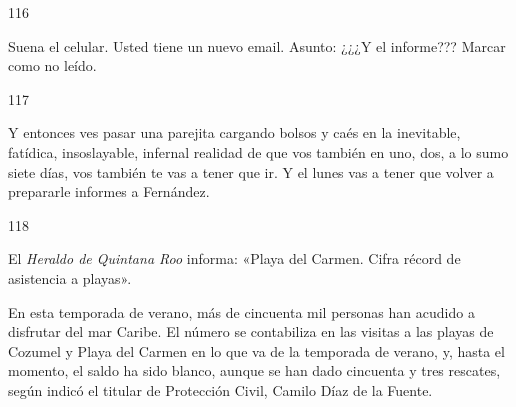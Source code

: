 \documentclass[12pt,twoside,openright,a5paper]{book}
\begin{document}
\vspace{0.5cm}

\hrulefill \hspace{0.1cm}\decofourleft\hspace{0.2cm} 116 \hspace{0.2cm}\decofourright \hspace{0.1cm}\hrulefill

\nopagebreak

\vspace{0.5cm}

\nopagebreak

Suena el celular. Usted tiene un nuevo email. Asunto: ¿¿¿Y el informe??? Marcar como no leído.


\vspace{0.5cm}

\hrulefill \hspace{0.1cm}\decofourleft\hspace{0.2cm} 117 \hspace{0.2cm}\decofourright \hspace{0.1cm}\hrulefill

\nopagebreak

\vspace{0.5cm}

\nopagebreak

Y entonces ves pasar una parejita cargando bolsos y caés en la
inevitable, fatídica, insoslayable, infernal realidad de que vos también en
uno, dos, a lo sumo siete días, vos también te vas a tener que ir. Y
el lunes vas a tener que volver a prepararle informes a Fernández.

\vspace{0.5cm}

\hrulefill \hspace{0.1cm}\decofourleft\hspace{0.2cm} 118 \hspace{0.2cm}\decofourright \hspace{0.1cm}\hrulefill

\nopagebreak

\vspace{0.5cm}

\nopagebreak

El \emph{Heraldo de Quintana Roo} informa: «Playa del Carmen. Cifra récord de
asistencia a playas».

En esta temporada de verano, más de cincuenta mil personas
han acudido a disfrutar del mar Caribe. 
El número se contabiliza en las visitas a las playas de Cozumel y Playa
del Carmen en lo que va de la temporada de verano, y, hasta el momento, el
saldo ha sido blanco, aunque se han dado cincuenta y tres rescates, según indicó el titular de
Protección Civil, Camilo Díaz de la Fuente.
\end{document}
